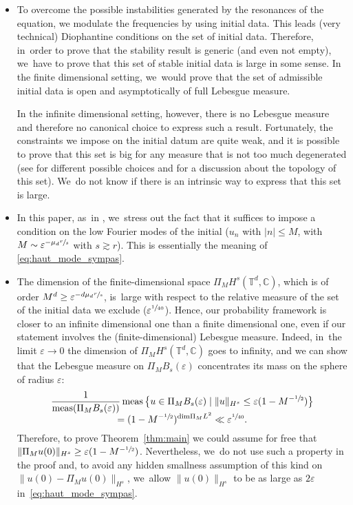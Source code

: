 \documentclass[JEP,XML,SOM,Unicode,published]{cedram}
\theoremstyle{plain}
\theoremstyle{definition}
\DeclareMathOperator{\meas}{meas}
\newcommand{\C}{\mathbb{C}}
\newcommand{\T}{\mathbb{T}}
\newcommand{\1}{\mathbf{1}}
\let\epsilon\varepsilon
\begin{document}
 \label{sub:proba}
\begin{itemize}
\item To overcome the possible instabilities generated by the resonances of the equation, we
modulate the frequencies by using initial data. This leads (very technical) Diophantine conditions on the set of initial data. Therefore, in~order to prove that the stability result is generic (and even not empty), we~have to prove that this set of stable initial data is large in some sense. In the finite dimensional setting, we~would prove that the set of admissible initial data is open and asymptotically of full Lebesgue measure.

In the infinite dimensional setting, however, there is no Lebesgue measure and therefore no canonical choice to express such a result. Fortunately, the constraints we impose on the initial datum are quite weak, and it is possible to prove that this set is big for any measure that is not too much degenerated (see \eg \cite{KillBill,KtA,LX23,zhiqiang} for different possible choices and \cite{KtA} for a discussion about the topology of this set). We~do not know if there is an intrinsic way to express that this set is large.

\item In this paper, as~in \cite{zhiqiang}, we~stress out the fact that it suffices to impose a condition on the low Fourier modes of the initial (\ie $u_n$ with $|n|\leq M$, with $M\sim \varepsilon^{- \mu_d \sfrac{r}s}$ with $s\gtrsim r$). This is essentially the meaning of \eqref{eq:haut_mode_sympas}.

\item
The dimension of the finite-dimensional space $\Pi_{M}H^{s}(\T^{d}, \C)$, which is of order $M^d \geq \varepsilon^{- d\mu_d \sfrac{r}s}$, is~large with respect to the relative measure of the set of the initial data we exclude ($\varepsilon^{\sfrac{1}{40}}$). Hence, our probability framework is closer to an infinite dimensional one than a finite dimensional one, even if our statement involves the (finite-dimensional) Lebesgue measure.
Indeed, in~the limit $\epsilon\to0$ the dimension of $\Pi_{M}H^{s}(\T^{d},\C)$ goes to infinity, and we can show that the Lebesgue measure on $\Pi_{M}B_{s}(\epsilon)$ concentrates its mass on the sphere of radius $\epsilon$:\vspace*{-5pt}\enlargethispage{\baselineskip}
\begin{multline*}
\frac{1}{\meas(\Pi_{M}B_{s}(\epsilon))}
\meas
\big\{
u\in\Pi_{M}B_{s}(\epsilon)\mid \|u\|_{H^{s}}\leq \epsilon(1-M^{-\sfrac{1}{2}})
\big\}
\\[
-5pt]
=
(1- M^{-\sfrac{1}{2}})^{\mathrm{dim} \Pi_{M}L^2}
\ll
\epsilon^{\sfrac{1}{40}}.
\end{multline*}
Therefore, to prove Theorem~\ref{thm:main} we could assume for free that $\| \Pi_M u(0) \|_{H^s} \geq \varepsilon (1-\nobreak M^{-\sfrac{1}{2}})$. Nevertheless, we~do not use such a property in the proof and, to avoid any hidden smallness assumption of this kind on $\| u(0) - \Pi_M u(0)\|_{H^s}$, we~allow $\|u(0)\|_{H^s}$ to be as large as $2\varepsilon$ in~\eqref{eq:haut_mode_sympas}.


\end{itemize}
\end{document}
